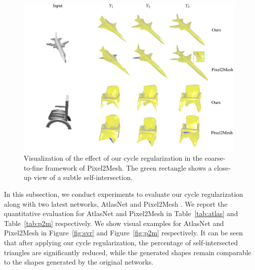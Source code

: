 \begin{figure}
	\centering
	\includegraphics[width=\textwidth]{img/p2m/3level}
	\caption{Visualization of the effect of our cycle regularization in the coarse-to-fine framework of Pixel2Mesh. The green rectangle shows a close-up view of a subtle self-intersection.}
	\label{fig:3level}
\end{figure}
In this subsection, we conduct experiments to evaluate our cycle regularization along with two latest networks, AtlasNet \cite{atlasnet} and Pixel2Mesh \cite{pixel2mesh}. We report the quantitative evaluation for AtlasNet and Pixel2Mesh in Table~\ref{tab:atlas} and Table~\ref{tab:p2m} respectively. We show visual examples for AtlasNet and Pixel2Mesh in Figure~\ref{fig:svr} and Figure~\ref{fig:p2m} respectively. It can be seen that after applying our cycle regularization, the percentage of self-intersected triangles are significantly reduced, while the generated shapes remain comparable to the shapes generated by the original networks.

